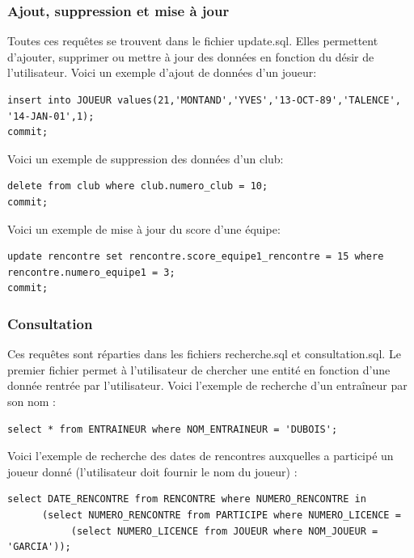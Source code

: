 \documentclass{article}
\begin{document}
\subsubsection{Ajout, suppression et mise à jour}
Toutes ces requêtes se trouvent dans le fichier update.sql. Elles permettent d'ajouter, supprimer ou mettre à jour des données en fonction du désir de l'utilisateur.
Voici un exemple d'ajout de données d'un joueur: \\

\begin{verbatim}
insert into JOUEUR values(21,'MONTAND','YVES','13-OCT-89','TALENCE', '14-JAN-01',1);
commit;
\end{verbatim}

Voici un exemple de suppression des données d'un club: \\

\begin{verbatim}
delete from club where club.numero_club = 10;
commit;
\end{verbatim}

Voici un exemple de mise à jour du score d'une équipe: \\

\begin{verbatim}
update rencontre set rencontre.score_equipe1_rencontre = 15 where rencontre.numero_equipe1 = 3;
commit;
\end{verbatim}

\subsubsection{Consultation}
Ces requêtes sont réparties dans les fichiers recherche.sql et consultation.sql. Le premier fichier permet à l'utilisateur de chercher une entité en fonction d'une donnée rentrée par l'utilisateur.
Voici l'exemple de recherche d'un entraîneur par son nom : \\

\begin{verbatim}
select * from ENTRAINEUR where NOM_ENTRAINEUR = 'DUBOIS';
\end{verbatim}

Voici l'exemple de recherche des dates de rencontres auxquelles a participé un joueur donné (l'utilisateur doit fournir le nom du joueur) : \\

\begin{verbatim}
select DATE_RENCONTRE from RENCONTRE where NUMERO_RENCONTRE in 
      (select NUMERO_RENCONTRE from PARTICIPE where NUMERO_LICENCE = 
           (select NUMERO_LICENCE from JOUEUR where NOM_JOUEUR = 'GARCIA'));
\end{verbatim}
\end{document}
